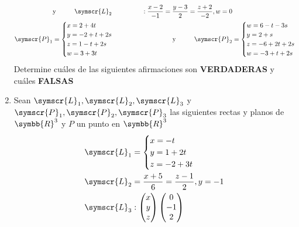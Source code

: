 \documentclass{article}
\def\fancyL{\symscr{L}}
\def\fancyP{\symscr{P}}
\def\realR{\symbb{R}}
\begin{document}
\begin{enumerate}
\[\begin{aligned}
            &\text{y}
            \hspace{1cm}
            \fancyL_2 &:
            \frac{x - 2}{-1} =
            \frac{y - 3}{2} =
            \frac{z + 2}{-2}, w = 0 \\
            \fancyP_1 &=
            \begin{cases}
                x = 2 + 4t \\
                y = -2 + t + 2s \\
                z = 1 -t + 2s \\
                w = 3 + 3t
            \end{cases}
            \hspace{1cm}
            &\text{y}
            \hspace{1cm}
            \fancyP_2 &=
            \begin{cases}
                w = 6 - t - 3s \\
                y = 2 + s \\
                z = -6 + 2t + 2s \\
                w = -3 + t + 2s
            \end{cases}
        \end{aligned}
    \]
    Determine cuáles de las siguientes afirmaciones son \textbf{VERDADERAS} y cuáles \textbf{FALSAS}
\item Sean \(\fancyL_1, \fancyL_2, \fancyL_3\) y \(\fancyP_1, \fancyP_2, \fancyP_3\) las siguientes rectas y planos de \(\realR^3\) y \(P\) un punto en \(\realR^3\)
    \[
        \begin{aligned}
            \fancyL_1 &=
            \begin{cases}
                x = -t \\
                y = 1 + 2t \\
                z = -2 + 3t
            \end{cases} \\
            \fancyL_2 &=
            \frac{x + 5}{6} =
            \frac{z - 1}{2},
            y = -1 \\
            \fancyL_3 &: 
            \begin{pmatrix}x \\ y \\ z\end{pmatrix}
            \begin{pmatrix}0 \\ -1 \\ 2\end{pmatrix}

\end{aligned}\]
\end{enumerate}
\end{document}
